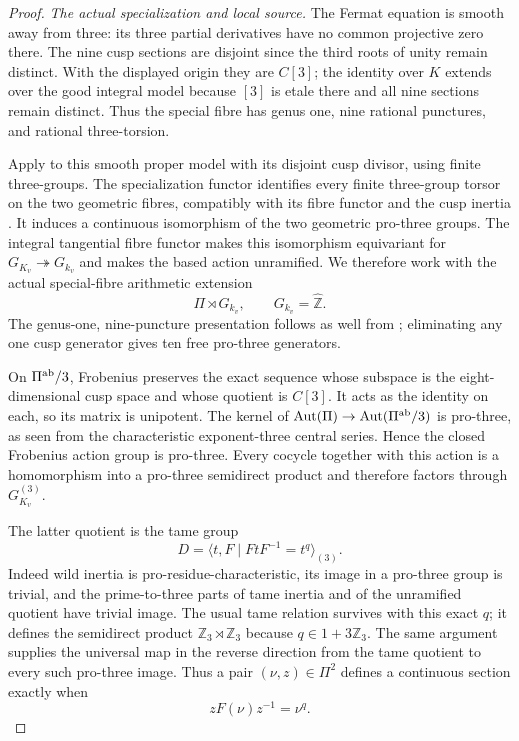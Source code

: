 \begin{proof}
\emph{The actual specialization and local source.}
The Fermat equation is smooth away from three: its three
partial derivatives have no common projective zero there.
The nine cusp sections are disjoint since the third roots of
unity remain distinct. With the displayed origin they are
$C[3]$; the identity over $K$ extends over the good integral
model because $[3]$ is etale there and all nine sections
remain distinct. Thus the special fibre has genus one, nine
rational punctures, and rational three-torsion.

Apply \cite[XIII, Corollary 2.9 and construction 2.10]{E_SGA1}
to this smooth proper model with its disjoint cusp divisor,
using finite three-groups. The specialization functor identifies
every finite three-group torsor on the two geometric fibres,
compatibly with its fibre functor and the cusp inertia
\cite[XIII, Lemma 2.11]{E_SGA1}. It induces a continuous
isomorphism of the two geometric pro-three groups. The
integral tangential fibre functor makes this isomorphism
equivariant for $G_{K_v}\twoheadrightarrow G_{k_v}$ and makes
the based action unramified. We therefore work with the actual
special-fibre arithmetic extension
\[
           \Pi\rtimes G_{k_v},\qquad G_{k_v}=\widehat{\mathbb Z}.
 \tag{E61.7}
\]
The genus-one, nine-puncture presentation follows as well
from \cite[XIII, Corollary 2.12]{E_SGA1}; eliminating any one
cusp generator gives ten free pro-three generators.

On $\Pi^{\rm ab}/3$, Frobenius preserves the exact sequence
whose subspace is the eight-dimensional cusp space and whose
quotient is $C[3]$. It acts as the identity on each, so its
matrix is unipotent. The kernel of
$\operatorname{Aut}(\Pi)\to\operatorname{Aut}(\Pi^{\rm ab}/3)$
is pro-three, as seen from the characteristic exponent-three
central series. Hence the closed Frobenius action group is
pro-three. Every cocycle together with this action is a
homomorphism into a pro-three semidirect product and therefore
factors through $G_{K_v}^{(3)}$.

The latter quotient is the tame group
\[
       D=\langle t,F\mid FtF^{-1}=t^q\rangle_{(3)}.
 \tag{E61.8}
\]
Indeed wild inertia is pro-residue-characteristic, its image
in a pro-three group is trivial, and the prime-to-three parts
of tame inertia and of the unramified quotient have trivial
image. The usual tame relation survives with this exact $q$;
it defines the semidirect product
$\mathbb Z_3\rtimes\mathbb Z_3$ because $q\in1+3\mathbb Z_3$.
The same argument supplies the universal map in the reverse
direction from the tame quotient to every such pro-three
image. Thus a pair $(\nu,z)\in\Pi^2$ defines a continuous
section exactly when
\[
                  zF(\nu)z^{-1}=\nu^q.                \tag{E61.9}
\]


\end{proof}
